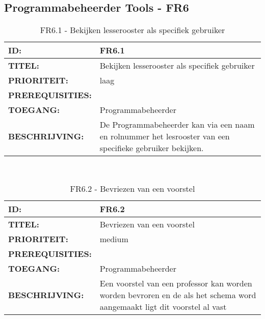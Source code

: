 \subsection{Programmabeheerder Tools - FR6}

\noindent\begin{table}[H]
            \begin{tabular}{l | p{10cm}}
                \textbf{ID:} & FR6.1 \\ \hline
                \textbf{TITEL:} & Bekijken lesserooster als specifiek gebruiker\\ \hline
                \textbf{PRIORITEIT:} &  laag \\ \hline
                \textbf{PREREQUISITIES:} & \\ \hline
                \textbf{TOEGANG:} & Programmabeheerder \\ \hline
                \textbf{BESCHRIJVING:} & De Programmabeheerder kan via een naam en rolnummer het lesrooster van een specifieke gebruiker bekijken. \\ 
            \end{tabular}\\
            \caption{FR6.1 - Bekijken lesserooster als specifiek gebruiker}
            \label{tab:FR6.1 - Bekijken lesserooster als specifiek gebruiker}
        \end{table}
        
\noindent\begin{table}[H]
            \begin{tabular}{l | p{10cm}}
                \textbf{ID:} & FR6.2 \\ \hline
                \textbf{TITEL:} & Bevriezen van een voorstel\\ \hline
                \textbf{PRIORITEIT:} &  medium \\ \hline
                \textbf{PREREQUISITIES:} & \\ \hline
                \textbf{TOEGANG:} & Programmabeheerder \\ \hline
                \textbf{BESCHRIJVING:} & Een voorstel van een professor kan worden worden bevroren en de als het schema word aangemaakt ligt dit voorstel al vast\\ 
            \end{tabular}\\
            \caption{FR6.2 - Bevriezen van een voorstel}
            \label{tab:FR6.2 - Bevriezen van een voorstel}
        \end{table}
        
